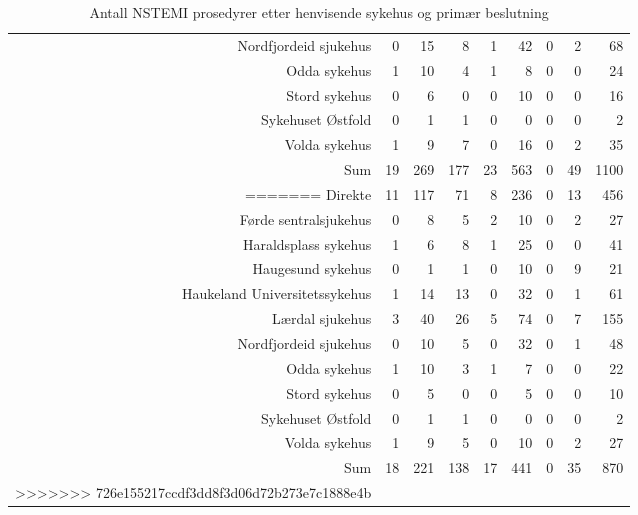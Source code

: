 \documentclass[presentation,xcolor=pdftex,dvipsnames,table]{beamer}
\begin{document}
\begin{frame}
\begin{tiny}
\begin{table}[ht]
\begin{tabular}{rrrrrrrrr}
  Nordfjordeid sjukehus & 0 & 15 & 8 & 1 & 42 & 0 & 2 & 68 \\ 
  Odda sykehus & 1 & 10 & 4 & 1 & 8 & 0 & 0 & 24 \\ 
  Stord sykehus & 0 & 6 & 0 & 0 & 10 & 0 & 0 & 16 \\ 
  Sykehuset Østfold & 0 & 1 & 1 & 0 & 0 & 0 & 0 & 2 \\ 
  Volda sykehus & 1 & 9 & 7 & 0 & 16 & 0 & 2 & 35 \\ 
  Sum & 19 & 269 & 177 & 23 & 563 & 0 & 49 & 1100 \\ 
=======
Direkte & 11 & 117 & 71 & 8 & 236 & 0 & 13 & 456 \\ 
  Førde sentralsjukehus & 0 & 8 & 5 & 2 & 10 & 0 & 2 & 27 \\ 
  Haraldsplass sykehus & 1 & 6 & 8 & 1 & 25 & 0 & 0 & 41 \\ 
  Haugesund sykehus & 0 & 1 & 1 & 0 & 10 & 0 & 9 & 21 \\ 
  Haukeland Universitetssykehus & 1 & 14 & 13 & 0 & 32 & 0 & 1 & 61 \\ 
  Lærdal sjukehus & 3 & 40 & 26 & 5 & 74 & 0 & 7 & 155 \\ 
  Nordfjordeid sjukehus & 0 & 10 & 5 & 0 & 32 & 0 & 1 & 48 \\ 
  Odda sykehus & 1 & 10 & 3 & 1 & 7 & 0 & 0 & 22 \\ 
  Stord sykehus & 0 & 5 & 0 & 0 & 5 & 0 & 0 & 10 \\ 
  Sykehuset Østfold & 0 & 1 & 1 & 0 & 0 & 0 & 0 & 2 \\ 
  Volda sykehus & 1 & 9 & 5 & 0 & 10 & 0 & 2 & 27 \\ 
  Sum & 18 & 221 & 138 & 17 & 441 & 0 & 35 & 870 \\ 
>>>>>>> 726e155217ccdf3dd8f3d06d72b273e7c1888e4b
   \bottomrule
\end{tabular}
\caption{Antall NSTEMI prosedyrer etter henvisende sykehus og primær beslutning} 
\end{table}\end{tiny}
\end{frame}
\end{document}

